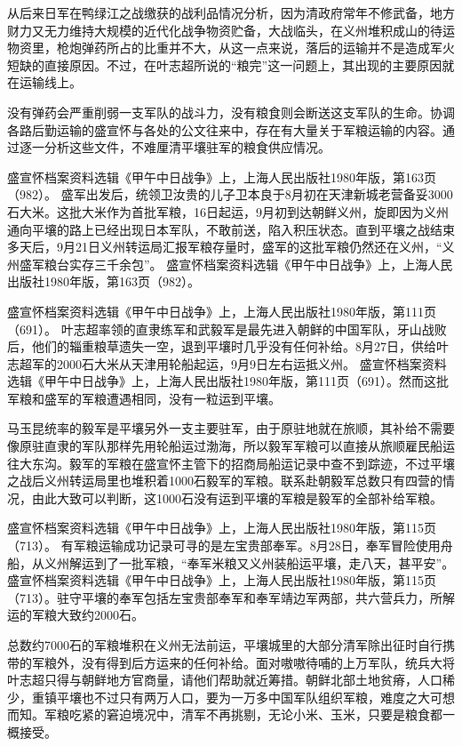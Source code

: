 \documentclass[12pt,UTF8]{ctexbook}
\begin{document}
从后来日军在鸭绿江之战缴获的战利品情况分析，因为清政府常年不修武备，地方财力又无力维持大规模的近代化战争物资贮备，大战临头，在义州堆积成山的待运物资里，枪炮弹药所占的比重并不大，从这一点来说，落后的运输并不是造成军火短缺的直接原因。不过，在叶志超所说的“粮完”这一问题上，其出现的主要原因就在运输线上。

没有弹药会严重削弱一支军队的战斗力，没有粮食则会断送这支军队的生命。协调各路后勤运输的盛宣怀与各处的公文往来中，存在有大量关于军粮运输的内容。通过逐一分析这些文件，不难厘清平壤驻军的粮食供应情况。

盛宣怀档案资料选辑《甲午中日战争》上，上海人民出版社1980年版，第163页（982）。
盛军出发后，统领卫汝贵的儿子卫本良于8月初在天津新城老营备妥3000石大米。这批大米作为首批军粮，16日起运，9月初到达朝鲜义州，旋即因为义州通向平壤的路上已经出现日本军队，不敢前送，陷入积压状态。直到平壤之战结束多天后，9月21日义州转运局汇报军粮存量时，盛军的这批军粮仍然还在义州，“义州盛军粮台实存三千余包”。 盛宣怀档案资料选辑《甲午中日战争》上，上海人民出版社1980年版，第163页（982）。

盛宣怀档案资料选辑《甲午中日战争》上，上海人民出版社1980年版，第111页（691）。
叶志超率领的直隶练军和武毅军是最先进入朝鲜的中国军队，牙山战败后，他们的辎重粮草遗失一空，退到平壤时几乎没有任何补给。8月27日，供给叶志超军的2000石大米从天津用轮船起运，9月9日左右运抵义州。 盛宣怀档案资料选辑《甲午中日战争》上，上海人民出版社1980年版，第111页（691）。然而这批军粮和盛军的军粮遭遇相同，没有一粒运到平壤。

马玉昆统率的毅军是平壤另外一支主要驻军，由于原驻地就在旅顺，其补给不需要像原驻直隶的军队那样先用轮船运过渤海，所以毅军军粮可以直接从旅顺雇民船运往大东沟。毅军的军粮在盛宣怀主管下的招商局船运记录中查不到踪迹，不过平壤之战后义州转运局里也堆积着1000石毅军的军粮。联系赴朝毅军总数只有四营的情况，由此大致可以判断，这1000石没有运到平壤的军粮是毅军的全部补给军粮。

盛宣怀档案资料选辑《甲午中日战争》上，上海人民出版社1980年版，第115页（713）。
有军粮运输成功记录可寻的是左宝贵部奉军。8月28日，奉军冒险使用舟船，从义州解运到了一批军粮，“奉军米粮又义州装船运平壤，走八天，甚平安”。 盛宣怀档案资料选辑《甲午中日战争》上，上海人民出版社1980年版，第115页（713）。驻守平壤的奉军包括左宝贵部奉军和奉军靖边军两部，共六营兵力，所解运的军粮大致约2000石。

总数约7000石的军粮堆积在义州无法前运，平壤城里的大部分清军除出征时自行携带的军粮外，没有得到后方运来的任何补给。面对嗷嗷待哺的上万军队，统兵大将叶志超只得与朝鲜地方官商量，请他们帮助就近筹措。朝鲜北部土地贫瘠，人口稀少，重镇平壤也不过只有两万人口，要为一万多中国军队组织军粮，难度之大可想而知。军粮吃紧的窘迫境况中，清军不再挑剔，无论小米、玉米，只要是粮食都一概接受。
\end{document}
